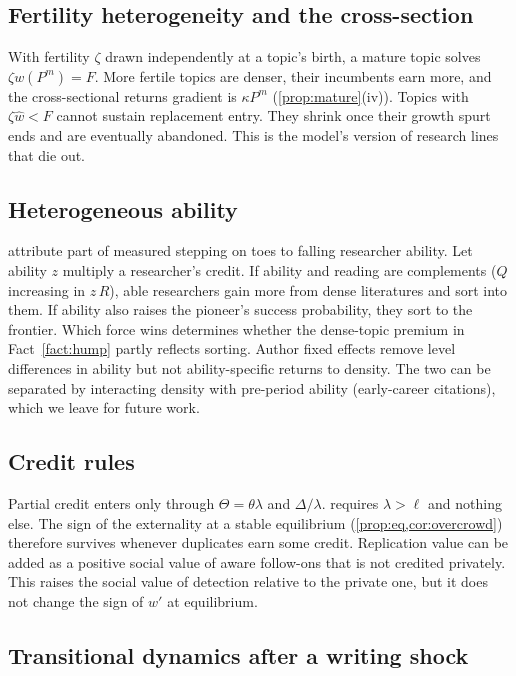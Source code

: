 \subsection{Fertility heterogeneity and the cross-section}

With fertility $\zeta$ drawn independently at a topic's birth, a mature topic
solves $\zeta w(P^m)=F$. More fertile topics are denser, their incumbents earn
more, and the cross-sectional returns gradient is $\kappa P^m$
(\cref{prop:mature}(iv)). Topics with $\zeta\hat w<F$ cannot sustain
replacement entry. They shrink once their growth spurt ends and are eventually
abandoned. This is the model's version of research lines that die out.

\subsection{Heterogeneous ability}

\citet{ekerdtwu2024} attribute part of measured stepping on toes to falling
researcher ability. Let ability $z$ multiply a researcher's credit. If ability
and reading are complements ($Q$ increasing in $z\,R$), able researchers gain
more from dense literatures and sort into them. If ability also raises the
pioneer's success probability, they sort to the frontier. Which force wins
determines whether the dense-topic premium in Fact~\ref{fact:hump} partly reflects
sorting. Author fixed effects remove level differences in ability but not
ability-specific returns to density. The two can be separated by interacting
density with pre-period ability (early-career citations), which we leave for
future work.

\subsection{Credit rules}

Partial credit enters only through $\Theta=\theta\lambda$ and $\Delta/\lambda$.
 requires $\lambda>\ell$ and nothing else. The sign of the externality
at a stable equilibrium (\cref{prop:eq,cor:overcrowd}) therefore survives
whenever duplicates earn some credit. Replication value can be added as a
positive social value of aware follow-ons that is not credited privately. This
raises the social value of detection relative to the private one, but it
does not change the sign of $w'$ at equilibrium.

\subsection{Transitional dynamics after a writing shock}


